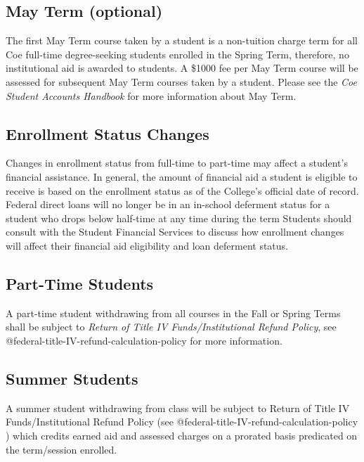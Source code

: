 \documentclass[
  letterpaper,
]{scrbook}
\begin{document}
\subsection{May Term (optional)}\label{may-term-optional-1}

The first May Term course taken by a student is a non-tuition charge
term for all Coe full-time degree-seeking students enrolled in the
Spring Term, therefore, no institutional aid is awarded to students. A
\$1000 fee per May Term course will be assessed for subsequent May Term
courses taken by a student. Please see the \emph{Coe Student Accounts
Handbook} for more information about May Term.

\subsection{Enrollment Status Changes}\label{enrollment-status-changes}

Changes in enrollment status from full-time to part-time may affect a
student's financial assistance. In general, the amount of financial aid
a student is eligible to receive is based on the enrollment status as of
the College's official date of record. Federal direct loans will no
longer be in an in-school deferment status for a student who drops below
half-time at any time during the term Students should consult with the
Student Financial Services to discuss how enrollment changes will affect
their financial aid eligibility and loan deferment status.

\subsection{Part-Time Students}\label{part-time-students}

A part-time student withdrawing from all courses in the Fall or Spring
Terms shall be subject to \emph{Return of Title IV Funds/Institutional
Refund Policy}, see @federal-title-IV-refund-calculation-policy for more
information.

\subsection{Summer Students}\label{summer-students}

A summer student withdrawing from class will be subject to Return of
Title IV Funds/Institutional Refund Policy (see
@federal-title-IV-refund-calculation-policy ) which credits earned aid
and assessed charges on a prorated basis predicated on the term/session
enrolled.
\end{document}
